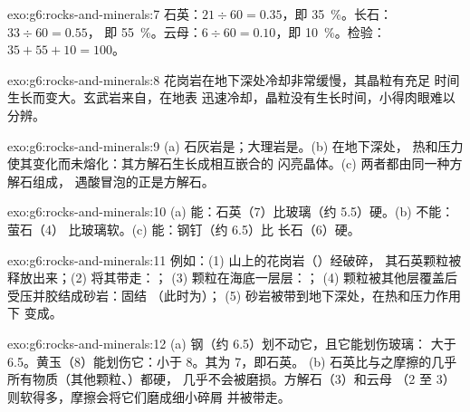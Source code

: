 \begin{solution}{exo:g6:rocks-and-minerals:7}
石英：$21 \div 60 = 0.35$，即 35~\%。长石：$33 \div 60 = 0.55$，
即 55~\%。云母：$6 \div 60 = 0.10$，即 10~\%。检验：
$35 + 55 + 10 = 100$。
\end{solution}

\begin{solution}{exo:g6:rocks-and-minerals:8}
花岗岩在地下深处冷却非常缓慢，其晶粒有充足
时间生长而变大。玄武岩来自，在地表
迅速冷却，晶粒没有生长时间，小得肉眼难以分辨。
\end{solution}

\begin{solution}{exo:g6:rocks-and-minerals:9}
(a) 石灰岩是；大理岩是。(b) 在地下深处，
热和压力使其变化而未熔化：其方解石生长成相互嵌合的
闪亮晶体。(c) 两者都由同一种方解石组成，
遇酸冒泡的正是方解石。
\end{solution}

\begin{solution}{exo:g6:rocks-and-minerals:10}
(a) 能：石英（7）比玻璃（约 5.5）硬。(b) 不能：萤石（4）
比玻璃软。(c) 能：钢钉（约 6.5）比
长石（6）硬。
\end{solution}

\begin{solution}{exo:g6:rocks-and-minerals:11}
例如：(1) 山上的花岗岩（）经破碎，
其石英颗粒被释放出来；(2) 将其带走：；
(3) 颗粒在海底一层层：；
(4) 颗粒被其他层覆盖后受压并胶结成砂岩：固结
（此时为）；
(5) 砂岩被带到地下深处，在热和压力作用下
变成。
\end{solution}

\begin{solution}{exo:g6:rocks-and-minerals:12}
(a) 钢（约 6.5）划不动它，且它能划伤玻璃：
大于 6.5。黄玉（8）能划伤它：小于 8。其为 7，即石英。
(b) 石英比与之摩擦的几乎所有物质（其他颗粒、）都硬，
几乎不会被磨损。方解石（3）和云母
（2 至 3）则软得多，摩擦会将它们磨成细小碎屑
并被带走。
\end{solution}

